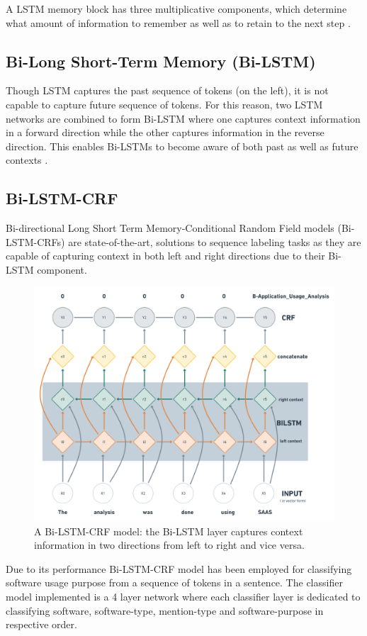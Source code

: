 A \ac{LSTM} memory block has three multiplicative components, which determine what amount of information to remember as well as to retain to the next step \citep{ma2016end}. 


\subsection{Bi-Long Short-Term Memory (\ac{Bi-LSTM})}
\label{sec:chapter05:DLModels:BiLSTM}

Though \ac{LSTM} captures the past sequence of tokens (on the left), it is not capable to capture future sequence of tokens. For this reason, two LSTM networks are combined to form \ac{Bi-LSTM} where one captures context information in a forward direction while the other captures information in the reverse direction. This enables \ac{Bi-LSTM}s to become aware of both past as well as future contexts \citep{ma2016end}. 

\subsection{\ac{Bi-LSTM-CRF}}
\label{sec:chapter05:DLModels:BiLSTMCRF}

Bi-directional Long Short Term Memory-Conditional Random Field models (\ac{Bi-LSTM-CRF}s) are state-of-the-art, solutions to sequence labeling tasks as they are capable of capturing context in both left and right directions due to their \ac{Bi-LSTM} component. 

\begin{figure}[htbp]
	\centering
	\includegraphics[width=.60\textwidth]{4.graphics/figures/ch_5/Bi-LSTM-CRF}
	\caption{A \ac{Bi-LSTM-CRF} model: the \ac{Bi-LSTM} layer captures context information in two directions from left to right and vice versa. }
	\label{fig:chapter03:setup}
\end{figure}

Due to its performance \ac{Bi-LSTM-CRF} model has been employed for classifying software usage purpose from a sequence of tokens in a sentence. The classifier model implemented is a 4 layer network where each classifier layer is dedicated to classifying software, software-type, mention-type and software-purpose in respective order. \\

